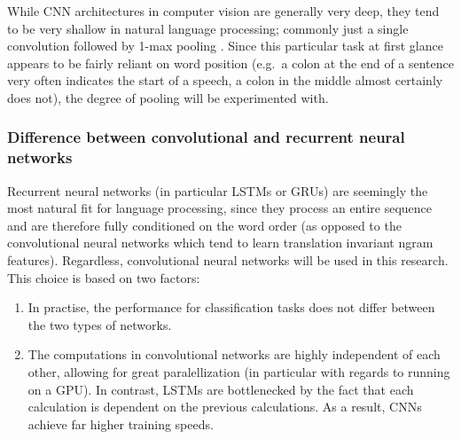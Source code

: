 While CNN architectures in computer vision are generally very deep, they tend to
be very shallow in natural language processing; commonly just a single
convolution followed by 1-max pooling \citep{zhang2015conv}. Since this
particular task at first glance appears to be fairly reliant on word position
(e.g.\ a colon at the end of a sentence very often indicates the start of a
speech, a colon in the middle almost certainly does not), the degree of pooling
will be experimented with.

\subsubsection{Difference between convolutional and recurrent neural networks}
Recurrent neural networks (in particular LSTMs or GRUs) are seemingly the most
natural fit for language processing, since they process an entire sequence and
are therefore fully conditioned on the word order (as opposed to the
convolutional neural networks which tend to learn translation invariant ngram
features). Regardless, convolutional neural networks will be used in this
research. This choice is based on two factors:
\begin{enumerate}
\item In practise, the performance for classification tasks does not differ
  between the two types of networks.\citep{cnnrnn}
\item The computations in convolutional networks are highly independent of
  each other, allowing for great paralellization (in particular with regards to
  running on a GPU). In contrast, LSTMs are bottlenecked by the fact that each
  calculation is dependent on the previous calculations. As a result, CNNs
  achieve far higher training speeds.\citep{facebook}
\end{enumerate}


